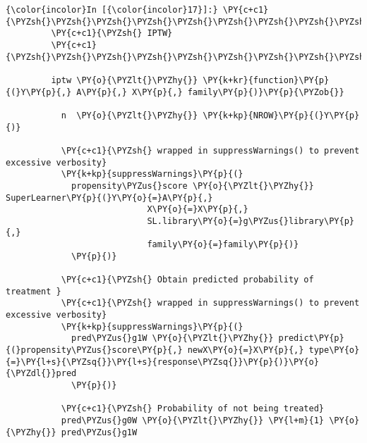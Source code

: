    \begin{Verbatim}[commandchars=\\\{\}]
{\color{incolor}In [{\color{incolor}17}]:} \PY{c+c1}{\PYZsh{}\PYZsh{}\PYZsh{}\PYZsh{}\PYZsh{}\PYZsh{}\PYZsh{}\PYZsh{}\PYZsh{}\PYZsh{}\PYZsh{}\PYZsh{}\PYZsh{}\PYZsh{}\PYZsh{}\PYZsh{}\PYZsh{}\PYZsh{}\PYZsh{}\PYZsh{}\PYZsh{}\PYZsh{}\PYZsh{}\PYZsh{}\PYZsh{}\PYZsh{}\PYZsh{}\PYZsh{}\PYZsh{}\PYZsh{}\PYZsh{}\PYZsh{}\PYZsh{}\PYZsh{}\PYZsh{}\PYZsh{}\PYZsh{}\PYZsh{}\PYZsh{}\PYZsh{}\PYZsh{}\PYZsh{}\PYZsh{}\PYZsh{}\PYZsh{}\PYZsh{}\PYZsh{}\PYZsh{}\PYZsh{}\PYZsh{}\PYZsh{}\PYZsh{}\PYZsh{}\PYZsh{}\PYZsh{}\PYZsh{}\PYZsh{}\PYZsh{}\PYZsh{}\PYZsh{}\PYZsh{}}
         \PY{c+c1}{\PYZsh{} IPTW}
         \PY{c+c1}{\PYZsh{}\PYZsh{}\PYZsh{}\PYZsh{}\PYZsh{}\PYZsh{}\PYZsh{}\PYZsh{}\PYZsh{}\PYZsh{}\PYZsh{}\PYZsh{}\PYZsh{}\PYZsh{}\PYZsh{}\PYZsh{}\PYZsh{}\PYZsh{}\PYZsh{}\PYZsh{}\PYZsh{}\PYZsh{}\PYZsh{}\PYZsh{}\PYZsh{}\PYZsh{}\PYZsh{}\PYZsh{}\PYZsh{}\PYZsh{}\PYZsh{}\PYZsh{}\PYZsh{}\PYZsh{}\PYZsh{}\PYZsh{}\PYZsh{}\PYZsh{}\PYZsh{}\PYZsh{}\PYZsh{}\PYZsh{}\PYZsh{}\PYZsh{}\PYZsh{}\PYZsh{}\PYZsh{}\PYZsh{}\PYZsh{}\PYZsh{}\PYZsh{}\PYZsh{}\PYZsh{}\PYZsh{}\PYZsh{}\PYZsh{}\PYZsh{}\PYZsh{}\PYZsh{}\PYZsh{}\PYZsh{}}
         
         iptw \PY{o}{\PYZlt{}\PYZhy{}} \PY{k+kr}{function}\PY{p}{(}Y\PY{p}{,} A\PY{p}{,} X\PY{p}{,} family\PY{p}{)}\PY{p}{\PYZob{}}
             
           n  \PY{o}{\PYZlt{}\PYZhy{}} \PY{k+kp}{NROW}\PY{p}{(}Y\PY{p}{)}
             
           \PY{c+c1}{\PYZsh{} wrapped in suppressWarnings() to prevent excessive verbosity}
           \PY{k+kp}{suppressWarnings}\PY{p}{(}
             propensity\PYZus{}score \PY{o}{\PYZlt{}\PYZhy{}} SuperLearner\PY{p}{(}Y\PY{o}{=}A\PY{p}{,}
                            X\PY{o}{=}X\PY{p}{,}
                            SL.library\PY{o}{=}g\PYZus{}library\PY{p}{,}
                            family\PY{o}{=}family\PY{p}{)}
             \PY{p}{)} 
             
           \PY{c+c1}{\PYZsh{} Obtain predicted probability of treatment }
           \PY{c+c1}{\PYZsh{} wrapped in suppressWarnings() to prevent excessive verbosity}
           \PY{k+kp}{suppressWarnings}\PY{p}{(}
             pred\PYZus{}g1W \PY{o}{\PYZlt{}\PYZhy{}} predict\PY{p}{(}propensity\PYZus{}score\PY{p}{,} newX\PY{o}{=}X\PY{p}{,} type\PY{o}{=}\PY{l+s}{\PYZsq{}}\PY{l+s}{response\PYZsq{}}\PY{p}{)}\PY{o}{\PYZdl{}}pred
             \PY{p}{)} 
             
           \PY{c+c1}{\PYZsh{} Probability of not being treated}
           pred\PYZus{}g0W \PY{o}{\PYZlt{}\PYZhy{}} \PY{l+m}{1} \PY{o}{\PYZhy{}} pred\PYZus{}g1W
             

\end{Verbatim}
